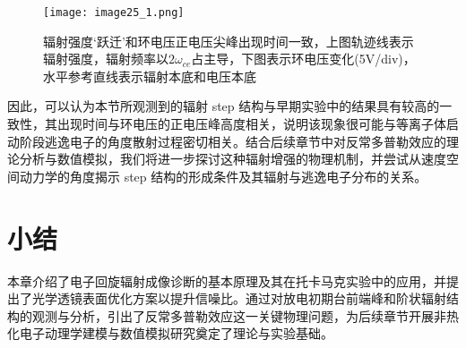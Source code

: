 \begin{figure}[H]
\centering
\texttt{[image: image25\_1.png]}
\caption{\label{fig:DAB}辐射强度‘跃迁’和环电压正电压尖峰出现时间一致，上图轨迹线表示辐射强度，辐射频率以$2ω_{ce}$占主导，下图表示环电压变化(5V/div)，水平参考直线表示辐射本底和电压本底}
\end{figure}
\par 因此，可以认为本节所观测到的辐射 step 结构与早期实验中的结果具有较高的一致性，其出现时间与环电压的正电压峰高度相关，说明该现象很可能与等离子体启动阶段逃逸电子的角度散射过程密切相关。结合后续章节中对反常多普勒效应的理论分析与数值模拟，我们将进一步探讨这种辐射增强的物理机制，并尝试从速度空间动力学的角度揭示 step 结构的形成条件及其辐射与逃逸电子分布的关系。





\section{小结}
本章介绍了电子回旋辐射成像诊断的基本原理及其在托卡马克实验中的应用，并提出了光学透镜表面优化方案以提升信噪比。通过对放电初期台前端峰和阶状辐射结构的观测与分析，引出了反常多普勒效应这一关键物理问题，为后续章节开展非热化电子动理学建模与数值模拟研究奠定了理论与实验基础。











